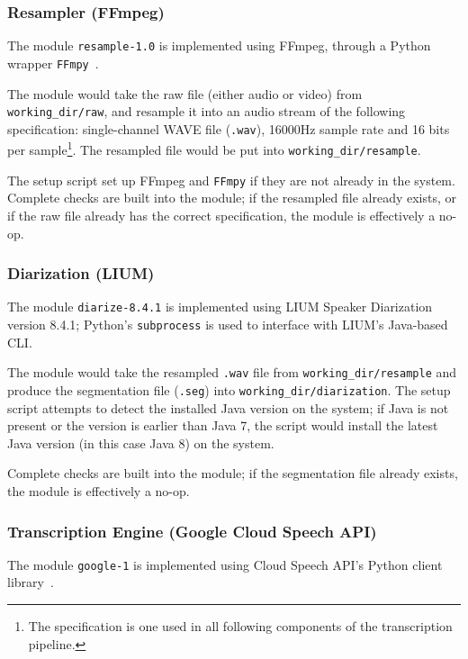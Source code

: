 \subsubsection{Resampler (FFmpeg)}

The module \texttt{resample-1.0} is implemented using FFmpeg, through a
Python wrapper \texttt{FFmpy}~\cite{ffmpy}.

The module would take the raw file (either audio or video) from
\texttt{working\_dir/raw}, and resample it into an audio stream of the
following specification: single-channel WAVE file (\texttt{.wav}),
16000Hz sample rate and 16 bits per sample\footnote{The specification
is one used in all following components of the transcription pipeline.}.
The resampled file would be put into \texttt{working\_dir/resample}.

The setup script set up FFmpeg and \texttt{FFmpy} if they are not already in
the system. Complete checks are built into the module; if the resampled file
already exists, or if the raw file already has the correct specification, the
module is effectively a no-op.

\subsubsection{Diarization (LIUM)}

The module \texttt{diarize-8.4.1} is implemented using LIUM Speaker
Diarization version 8.4.1; Python's \texttt{subprocess} is used to interface
with LIUM's Java-based CLI\@.

The module would take the resampled \texttt{.wav} file from
\texttt{working\_dir/resample} and produce the segmentation file
(\texttt{.seg}) into \texttt{working\_dir/diarization}. The setup script
attempts to detect the installed Java version on the system; if Java is
not present or the version is earlier than Java 7, the script would
install the latest Java version (in this case Java 8) on the system.

Complete checks are built into the module; if the segmentation file
already exists, the module is effectively a no-op.

\subsubsection{Transcription Engine (Google Cloud Speech API)}

The module \texttt{google-1} is implemented using Cloud Speech API's
Python client library~\cite{gh-gcs}.

